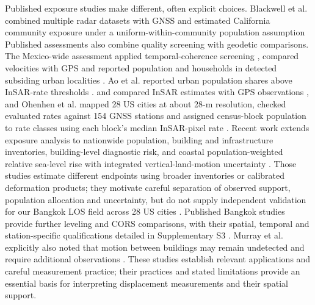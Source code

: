 \documentclass[pdflatex,sn-nature]{sn-jnl}
\providecommand{\DIFadd}[1]{{\protect\color{blue} \sf #1}} %
\providecommand{\DIFdel}[1]{{\protect\color{red} \scriptsize #1}} %
\providecommand{\DIFaddbegin}{} %
\providecommand{\DIFaddend}{} %
\providecommand{\DIFdelbegin}{} %
\providecommand{\DIFdelend}{} %
\begin{document}
\DIFdel{Published exposure studies make different, often explicit choices. Blackwell et al. combined multiple radar datasets with GNSS and estimated California community exposure under a uniform-within-community population assumption \citep{blackwell2020california}}\DIFdelend \DIFaddbegin \DIFadd{Published assessments also combine quality screening with geodetic comparisons}\DIFaddend . The Mexico-wide assessment applied temporal-coherence screening \DIFdelbegin \DIFdel{, compared velocities with GPS and reported population and households in detected subsiding urban localities \citep{fernandeztorres2024mexico}. Ao et al. reported urban population shares above InSAR-rate thresholds \citep{ao2024national}. }\DIFdelend \DIFaddbegin \DIFadd{and compared InSAR estimates with GPS observations \citep{fernandeztorres2024mexico}, and }\DIFaddend Ohenhen et al. \DIFdelbegin \DIFdel{mapped 28 US cities at about 28-m resolution, checked }\DIFdelend \DIFaddbegin \DIFadd{evaluated }\DIFaddend rates against 154 GNSS stations \DIFdelbegin \DIFdel{and assigned census-block population to rate classes using each block's median InSAR-pixel rate \citep{ohenhen2025uscities}. Recent work extends exposure analysis to nationwide population, building and infrastructure inventories, building-level diagnostic risk, and coastal population-weighted relative sea-level rise with integrated vertical-land-motion uncertainty \citep{xiong2026nationwide,yang2026buildingrisk,oelsmann2026coastal}. Those studies estimate different endpoints using broader inventories or calibrated deformation products; they motivate careful separation of observed support, population allocation and uncertainty, but do not supply independent validation for our Bangkok LOS field}\DIFdelend \DIFaddbegin \DIFadd{across 28 US cities \citep{ohenhen2025uscities}. Published Bangkok studies provide further leveling and CORS comparisons, with their spatial, temporal and station-specific qualifications detailed in Supplementary S3 \citep{luachapichatikul2020bangkok,pumpuang2024bangkapi,aieorattanawadee2022bangkok}}\DIFaddend . Murray et al. \DIFdelbegin \DIFdel{explicitly }\DIFdelend \DIFaddbegin \DIFadd{also }\DIFaddend noted that motion between buildings may remain undetected and require additional observations \citep{murray2025hawaii}. These \DIFdelbegin \DIFdel{studies establish relevant applications and careful measurement practice; their }\DIFdelend \DIFaddbegin \DIFadd{practices and stated limitations provide an essential basis for interpreting displacement measurements and their spatial support.
}
\end{document}
